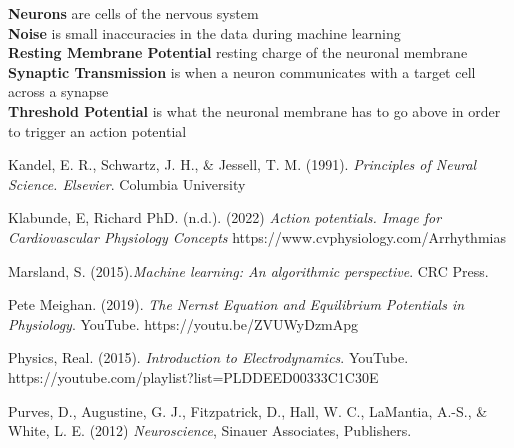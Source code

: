 \documentclass[english]{def}
\begin{document}
\noindent\textbf{Neurons} are cells of the nervous system\\

\noindent\textbf{Noise} is small inaccuracies in the data during machine learning\\


\noindent\textbf{Resting Membrane Potential} resting charge of the neuronal membrane\\

\noindent\textbf{Synaptic Transmission} is when a neuron communicates with a target cell across a synapse\\

\noindent\textbf{Threshold Potential} is what the neuronal membrane has to go above in order to trigger an action potential\\

\begin{thebibliography}{9}


\bibitem{}
Kandel, E. R., Schwartz, J. H., \& Jessell, T. M. (1991). \emph{Principles of Neural Science. Elsevier}. Columbia University 

\bibitem{}
Klabunde, E, Richard PhD. (n.d.). (2022) \emph{Action potentials. Image for Cardiovascular Physiology Concepts} https://www.cvphysiology.com/Arrhythmias

\bibitem{}
Marsland, S. (2015).\emph{Machine learning: An algorithmic perspective}. CRC Press. 

\bibitem{}
Pete Meighan. (2019). \emph{The Nernst Equation and Equilibrium Potentials in Physiology}. YouTube. https://youtu.be/ZVUWyDzmApg

\bibitem{}
Physics, Real. (2015). \emph{Introduction to Electrodynamics}. YouTube. https://youtube.com/playlist?list=PLDDEED00333C1C30E 

\bibitem{}
Purves, D., Augustine, G. J., Fitzpatrick, D., Hall, W. C., LaMantia, A.-S., \& White, L. E. (2012) \emph{Neuroscience}, Sinauer Associates, Publishers.

 






\end{thebibliography}
\end{document}
